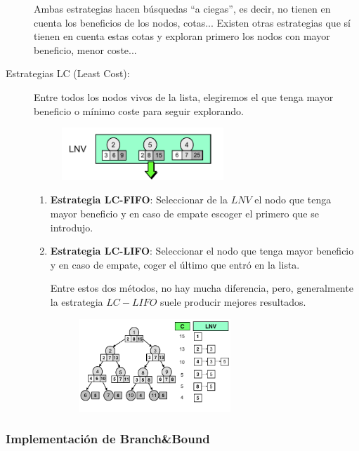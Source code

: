 \documentclass[10pt,a4paper,spanish]{report}
\theoremstyle{definition}
\theoremstyle{remark}
\begin{document}
\begin{description}
    Ambas estrategias hacen búsquedas ``a ciegas'', es decir, no tienen en cuenta los beneficios de los nodos, cotas... Existen otras estrategias que sí tienen en cuenta estas cotas y exploran primero los nodos con mayor beneficio, menor coste...

    \item [Estrategias LC (Least Cost):] Entre todos los nodos vivos de la lista, elegiremos el que tenga mayor beneficio o mínimo coste para seguir explorando.
    \begin{figure}[!h]
        \centering
        \includegraphics[width=0.6\textwidth]{lc}
    \end{figure}
    \begin{enumerate}[---]
        \item \textbf{Estrategia LC-FIFO}: Seleccionar de la $LNV$ el nodo que tenga mayor beneficio y en caso de empate escoger el primero que se introdujo.
        \item \textbf{Estrategia LC-LIFO}: Seleccionar el nodo que tenga mayor beneficio y en caso de empate, coger el último que entró en la lista.

        Entre estos dos métodos, no hay mucha diferencia, pero, generalmente la estrategia $LC-LIFO$ suele producir mejores resultados.
        \begin{figure}[!h]
            \centering
            \includegraphics[width=0.6\textwidth]{ej_lifo}
        \end{figure}
    \end{enumerate}
\end{description}

\subsubsection{\textcolor{coquelicot}Implementación de Branch\&Bound}
\end{document}
